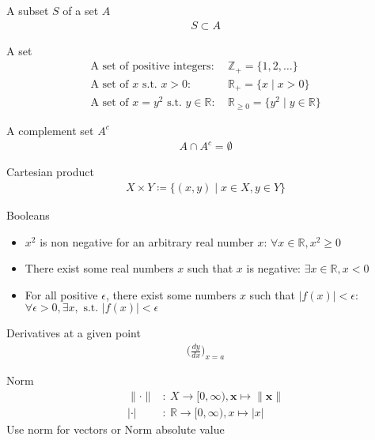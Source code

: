 \documentclass[dvipdfmx]{article}
\begin{document}
A subset $S$ of a set $A$
\begin{equation}
\begin{aligned}
  S \subset A
\end{aligned}
\end{equation}

A set
\begin{equation}
\begin{aligned}
  \text{A set of positive integers}:&~ \mathbb{Z}_{+} = \{1, 2, \dots\} \\
  \text{A set of $x$ s.t. $x > 0$}:&~ \mathbb{R}_{+} = \{x \mid x > 0 \} \\
  \text{A set of $x = y^2$ s.t. $y \in \mathbb{R}$}:&~ \mathbb{R}_{\geq 0} = \{y^2 \mid y \in \mathbb{R} \}
\end{aligned}
\end{equation}

A complement set $A^c$
\begin{equation}
\begin{aligned}
  A \cap A^c = \emptyset
\end{aligned}
\end{equation}

Cartesian product
\begin{equation}
\begin{aligned}
  X \times Y \coloneqq \{(x, y)\mid x\in X, y \in Y\}
\end{aligned}
\end{equation}

Booleans
\begin{itemize}
  \item $x^2$ is non negative for an arbitrary real number $x$: $\forall x \in \mathbb{R}, x^2 \geq 0$ 
  \item There exist some real numbers $x$ such that $x$ is negative: $\exists x \in \mathbb{R}, x < 0$ 
  \item For all positive $\epsilon$, there exist some numbers $x$ such that $|f(x)| < \epsilon$:
  $\forall \epsilon > 0, \exists x, \text{ s.t. } |f(x)|<\epsilon$
\end{itemize}

Derivatives at a given point
\begin{equation}
\begin{aligned}
  \biggl(\frac{dy}{dx}\biggr)_{x = a}
\end{aligned}
\end{equation}

Norm
\begin{equation}
\begin{aligned}
  \|\cdot\|&:~ X \rightarrow [0, \infty),
  \boldsymbol{x} \mapsto \|\boldsymbol{x}\| \\
  |\cdot|&:~ \mathbb{R} \rightarrow [0, \infty),
  x \mapsto |x|
\end{aligned}
\end{equation}
Use norm for vectors or 
Norm  absolute value
\end{document}
